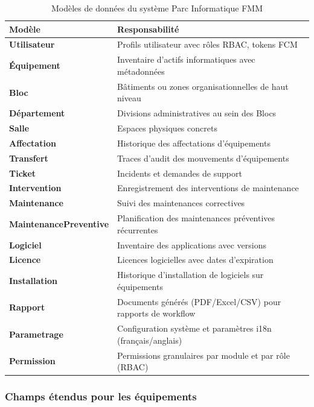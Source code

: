 \begin{table}[H]
\centering
\caption{Modèles de données du système Parc Informatique FMM}
\label{tab:models_sprint1}
\begin{tabular}{|l|p{7cm}|}
\hline
\textbf{Modèle} & \textbf{Responsabilité} \\
\hline
\textbf{Utilisateur} & Profils utilisateur avec rôles RBAC, tokens FCM \\
\hline
\textbf{Équipement} & Inventaire d'actifs informatiques avec métadonnées \\
\hline
\textbf{Bloc} & Bâtiments ou zones organisationnelles de haut niveau \\
\hline
\textbf{Département} & Divisions administratives au sein des Blocs \\
\hline
\textbf{Salle} & Espaces physiques concrets \\
\hline
\textbf{Affectation} & Historique des affectations d'équipements \\
\hline
\textbf{Transfert} & Traces d'audit des mouvements d'équipements \\
\hline
\textbf{Ticket} & Incidents et demandes de support \\
\hline
\textbf{Intervention} & Enregistrement des interventions de maintenance \\
\hline
\textbf{Maintenance} & Suivi des maintenances correctives \\
\hline
\textbf{MaintenancePreventive} & Planification des maintenances préventives récurrentes \\
\hline
\textbf{Logiciel} & Inventaire des applications avec versions \\
\hline
\textbf{Licence} & Licences logicielles avec dates d'expiration \\
\hline
\textbf{Installation} & Historique d'installation de logiciels sur équipements \\
\hline
\textbf{Rapport} & Documents générés (PDF/Excel/CSV) pour rapports de workflow \\
\hline
\textbf{Parametrage} & Configuration système et paramètres i18n (français/anglais) \\
\hline
\textbf{Permission} & Permissions granulaires par module et par rôle (RBAC) \\
\hline
\end{tabular}
\end{table}

\subsubsection{Champs étendus pour les équipements}

